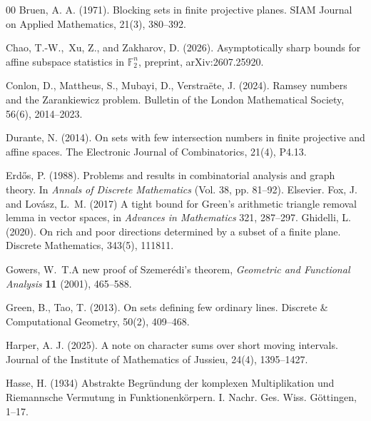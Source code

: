 \documentclass[10pt]{article}
\theoremstyle{definition}
\begin{document}
\begin{thebibliography}{00}
		 Bruen, A. A. (1971). Blocking sets in finite projective planes. SIAM Journal on Applied Mathematics, 21(3), 380--392.
		
		Chao, T.-W.,~Xu, Z., and Zakharov, D. (2026).
		\newblock Asymptotically sharp bounds for affine subspace statistics in
		\(\mathbb F_2^n\),
		\newblock preprint, arXiv:2607.25920.
		
		 Conlon, D., Mattheus, S., Mubayi, D.,  Verstra\"ete, J. (2024). Ramsey numbers and the Zarankiewicz problem. Bulletin of the London Mathematical Society, 56(6), 2014--2023.
		
		
		
		 Durante, N. (2014). On sets with few intersection numbers in finite projective and affine spaces. The Electronic Journal of Combinatorics, 21(4), P4.13.
		
		Erdős, P. (1988). Problems and results in combinatorial analysis and graph theory. In {\em Annals of Discrete Mathematics} (Vol. 38, pp. 81--92). Elsevier.
		 Fox, J. and Lovász, L.~M. (2017) \newblock A tight bound for Green's arithmetic triangle removal lemma in vector spaces, \newblock in  \emph{Advances in Mathematics} 321, 287–297.%
		 Ghidelli, L. (2020). On rich and poor directions determined by a subset of a finite plane. Discrete Mathematics, 343(5), 111811.
		
		 Gowers,  W.~T.\newblock A new proof of Szemerédi's theorem, \newblock \emph{Geometric and Functional Analysis} \textbf{11} (2001), 465--588.
		
		 Green, B.,  Tao, T. (2013). On sets defining few ordinary lines. Discrete \& Computational Geometry, 50(2), 409--468.
		
		 Harper, A. J. (2025). A note on character sums over short moving intervals. Journal of the Institute of Mathematics of Jussieu, 24(4), 1395--1427.
		
		 Hasse, H. (1934) Abstrakte Begründung der komplexen Multiplikation und Riemannsche Vermutung in Funktionenkörpern. I. Nachr. Ges. Wiss. Göttingen, 1–17.
		

\end{thebibliography}
\end{document}
